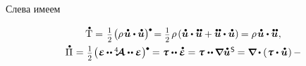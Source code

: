 \begin{otherlanguage}{russian}
\vspace{-0.2em} Слева имеем
\nopagebreak\vspace{-0.12em}\[\begin{array}{c}
\mathdotabove{\mathrm{T}} =^{\displaystyle \mathstrut^{\displaystyle \mathstrut}} \smalldisplaystyleonehalf \hspace{-0.25ex} \left( \rho \hspace{0.2ex} \mathdotabove{\bm{u}} \dotp^{\mathstrut} \hspace{-0.16ex} \mathdotabove{\bm{u}} \right)^{\tikz[baseline=-0.2ex] \draw[black, fill=black] (0,0) circle (.28ex);} \hspace{-0.25ex}
= \smalldisplaystyleonehalf \hspace{0.2ex} \rho \hspace{-0.1ex} \left( \mathdotabove{\bm{u}} \dotp \mathdotdotabove{\bm{u}} + \mathdotdotabove{\bm{u}} \dotp \mathdotabove{\bm{u}} \right) \hspace{-0.12ex} =
\rho \hspace{0.2ex} \mathdotabove{\bm{u}} \dotp \mathdotdotabove{\bm{u}} \hspace{0.1ex}, \\[.5em]
%
\mathdotabove{\Pi} \hspace{0.1ex} = \hspace{0.1ex} \smash{\smalldisplaystyleonehalf} \hspace{-0.25ex} \tikzmark{beginDerivativeOfElasticPotential} \left( \hspace{.1ex} \mathboldepsilon \hspace{-0.1ex} \dotdotp \hspace{-0.1ex} \stiffnesstensor \dotdotp \mathboldepsilon \hspace{.1ex} \right)^{\tikz[baseline=-0.2ex] \draw[black, fill=black] (0,0) circle (.28ex);} \hspace{-1.2ex} \tikzmark{endDerivativeOfElasticPotential} \hspace{.8ex}
= \mathboldtau \dotdotp \mathdotabove{\mathboldepsilon}
= \mathboldtau \hspace{0.1ex} \dotdotp \hspace{-0.12ex} \boldnabla \mathdotabove{\bm{u}}^{\hspace{0.1ex}\mathsf{S}} \hspace{-0.12ex} =
\boldnabla \hspace{-0.1ex} \dotp \left( \hspace{0.1ex} \mathboldtau \dotp \mathdotabove{\bm{u}} \hspace{0.1ex} \right) -

\end{array}\]
\end{otherlanguage}
